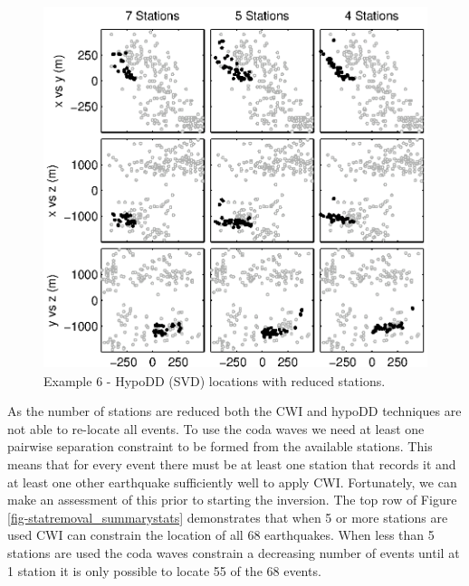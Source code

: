 \documentclass[extra, onecolumn, doublespacing]{gji}
\begin{document}
\begin{figure}
\includegraphics[height = 25pc]{diags/CalaverasLoc3_hypoDD_SVD.eps}
\caption{Example 6 - HypoDD (SVD) locations with reduced stations.}
\label{fig-HYPODDreducesstats}
\end{figure}


As the number of stations are reduced both the CWI and hypoDD
techniques are not able to re-locate all events. To use the coda
waves we need at least one pairwise separation constraint to be
formed from the available stations. This means that for every event
there must be at least one station that records it and at least one
other earthquake sufficiently well to apply CWI. Fortunately, we can
make an assessment of this prior to starting the inversion. The top
row of Figure \ref{fig-statremoval_summarystats} demonstrates that
when 5 or more stations are used CWI can constrain the location of
all 68 earthquakes. When less than 5 stations are used the coda
waves constrain a decreasing number of events until at 1 station it
is only possible to locate 55 of the 68 events.

\end{document}

